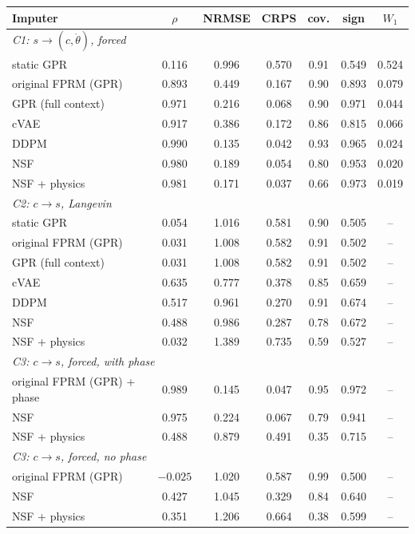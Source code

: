 \begin{tabular}{lcccccc}
Imputer & $\rho$ & NRMSE & CRPS & cov. & sign & $W_1$\\
\hline
\multicolumn{7}{l}{\textit{C1: $s\to(c,\dot\theta)$, forced}}\\
static GPR & 0.116 & 0.996 & 0.570 & 0.91 & 0.549 & 0.524\\
original FPRM (GPR) & 0.893 & 0.449 & 0.167 & 0.90 & 0.893 & 0.079\\
GPR (full context) & 0.971 & 0.216 & 0.068 & 0.90 & 0.971 & 0.044\\
cVAE & 0.917 & 0.386 & 0.172 & 0.86 & 0.815 & 0.066\\
DDPM & 0.990 & 0.135 & 0.042 & 0.93 & 0.965 & 0.024\\
NSF & 0.980 & 0.189 & 0.054 & 0.80 & 0.953 & 0.020\\
NSF + physics & 0.981 & 0.171 & 0.037 & 0.66 & 0.973 & 0.019\\
\multicolumn{7}{l}{\textit{C2: $c\to s$, Langevin}}\\
static GPR & 0.054 & 1.016 & 0.581 & 0.90 & 0.505 & --\\
original FPRM (GPR) & 0.031 & 1.008 & 0.582 & 0.91 & 0.502 & --\\
GPR (full context) & 0.031 & 1.008 & 0.582 & 0.91 & 0.502 & --\\
cVAE & 0.635 & 0.777 & 0.378 & 0.85 & 0.659 & --\\
DDPM & 0.517 & 0.961 & 0.270 & 0.91 & 0.674 & --\\
NSF & 0.488 & 0.986 & 0.287 & 0.78 & 0.672 & --\\
NSF + physics & 0.032 & 1.389 & 0.735 & 0.59 & 0.527 & --\\
\multicolumn{7}{l}{\textit{C3: $c\to s$, forced, with phase}}\\
original FPRM (GPR) + phase & 0.989 & 0.145 & 0.047 & 0.95 & 0.972 & --\\
NSF & 0.975 & 0.224 & 0.067 & 0.79 & 0.941 & --\\
NSF + physics & 0.488 & 0.879 & 0.491 & 0.35 & 0.715 & --\\
\multicolumn{7}{l}{\textit{C3: $c\to s$, forced, no phase}}\\
original FPRM (GPR) & $-0.025$ & 1.020 & 0.587 & 0.99 & 0.500 & --\\
NSF & 0.427 & 1.045 & 0.329 & 0.84 & 0.640 & --\\
NSF + physics & 0.351 & 1.206 & 0.664 & 0.38 & 0.599 & --\\
\end{tabular}
